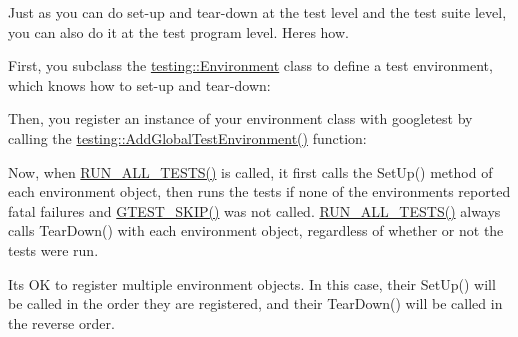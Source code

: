 Just as you can do set-\/up and tear-\/down at the test level and the test suite level, you can also do it at the test program level. Here\textquotesingle{}s how.

First, you subclass the {\ttfamily \mbox{\hyperlink{classtesting_1_1_environment}{testing\+::\+Environment}}} class to define a test environment, which knows how to set-\/up and tear-\/down\+:


\begin{DoxyCode}{0}
\DoxyCodeLine{}
\DoxyCodeLine{}
\DoxyCodeLine{\};}
\end{DoxyCode}


Then, you register an instance of your environment class with googletest by calling the {\ttfamily \mbox{\hyperlink{namespacetesting_a224caeebdb6586b728d204367fea1087}{testing\+::\+Add\+Global\+Test\+Environment()}}} function\+:


\begin{DoxyCode}{0}
\end{DoxyCode}


Now, when {\ttfamily \mbox{\hyperlink{googletest-master_2googletest_2include_2gtest_2gtest_8h_a853a3792807489591d3d4a2f2ff9359f}{R\+U\+N\+\_\+\+A\+L\+L\+\_\+\+T\+E\+S\+T\+S()}}} is called, it first calls the {\ttfamily Set\+Up()} method of each environment object, then runs the tests if none of the environments reported fatal failures and {\ttfamily \mbox{\hyperlink{googletest-master_2googletest_2include_2gtest_2gtest_8h_a3c0bbb980d533108ecc23c3534527d3c}{G\+T\+E\+S\+T\+\_\+\+S\+K\+I\+P()}}} was not called. {\ttfamily \mbox{\hyperlink{googletest-master_2googletest_2include_2gtest_2gtest_8h_a853a3792807489591d3d4a2f2ff9359f}{R\+U\+N\+\_\+\+A\+L\+L\+\_\+\+T\+E\+S\+T\+S()}}} always calls {\ttfamily Tear\+Down()} with each environment object, regardless of whether or not the tests were run.

It\textquotesingle{}s OK to register multiple environment objects. In this case, their {\ttfamily Set\+Up()} will be called in the order they are registered, and their {\ttfamily Tear\+Down()} will be called in the reverse order.

